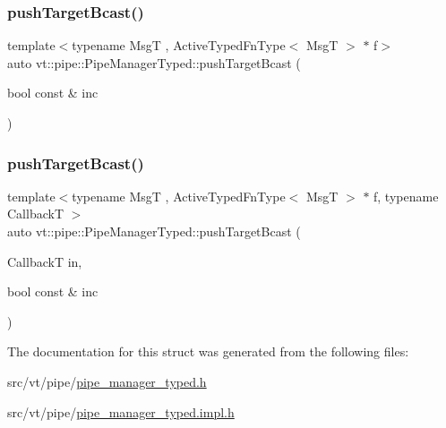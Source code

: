 \subsubsection{\texorpdfstring{push\+Target\+Bcast()}{pushTargetBcast()}\hspace{0.1cm}{\footnotesize\ttfamily [1/2]}}
{\footnotesize\ttfamily template$<$typename MsgT , Active\+Typed\+Fn\+Type$<$ Msg\+T $>$ $\ast$ f$>$ \\
auto vt\+::pipe\+::\+Pipe\+Manager\+Typed\+::push\+Target\+Bcast (\begin{DoxyParamCaption}\item[{bool const \&}]{inc }\end{DoxyParamCaption})}

\mbox{\label{structvt_1_1pipe_1_1_pipe_manager_typed_a89e6ea6de5c6723b1cef14657ba588ab}} 
\subsubsection{\texorpdfstring{push\+Target\+Bcast()}{pushTargetBcast()}\hspace{0.1cm}{\footnotesize\ttfamily [2/2]}}
{\footnotesize\ttfamily template$<$typename MsgT , Active\+Typed\+Fn\+Type$<$ Msg\+T $>$ $\ast$ f, typename CallbackT $>$ \\
auto vt\+::pipe\+::\+Pipe\+Manager\+Typed\+::push\+Target\+Bcast (\begin{DoxyParamCaption}\item[{CallbackT}]{in,  }\item[{bool const \&}]{inc }\end{DoxyParamCaption})}



The documentation for this struct was generated from the following files\+:\begin{DoxyCompactItemize}
\item 
src/vt/pipe/\hyperlink{pipe__manager__typed_8h}{pipe\+\_\+manager\+\_\+typed.\+h}\item 
src/vt/pipe/\hyperlink{pipe__manager__typed_8impl_8h}{pipe\+\_\+manager\+\_\+typed.\+impl.\+h}\end{DoxyCompactItemize}
